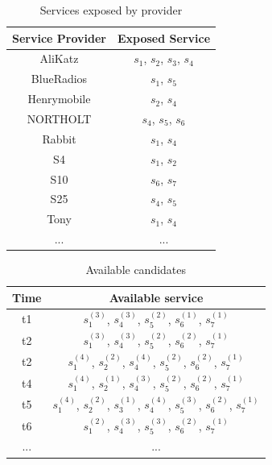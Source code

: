 \documentclass[journal]{IEEEtran}
\begin{document}
\begin{table}[!t]
\renewcommand{\arraystretch}{1.3}
\caption{Services exposed by provider}
\label{Services exposed by provider}
\centering
\begin{tabular}{c c}
\hline
\bfseries Service Provider & \bfseries Exposed Service\\
\hline
AliKatz     & $s_1$, $s_2$, $s_3$, $s_4$\\
BlueRadios  & $s_1$, $s_5$\\
Henrymobile & $s_2$, $s_4$\\
NORTHOLT    & $s_4$, $s_5$, $s_6$ \\
Rabbit      & $s_1$, $s_4$\\
S4          & $s_1$, $s_2$\\
S10         & $s_6$, $s_7$\\
S25         & $s_4$, $s_5$\\
Tony        & $s_1$, $s_4$\\
... & ...\\
\hline
\end{tabular}
\end{table}

\begin{table}[!t]
\renewcommand{\arraystretch}{1.8}
\caption{Available candidates}
\label{Available candidates}
\centering
\begin{tabular}{c c}
\hline
\bfseries Time & \bfseries Available service\\
\hline
t1     & $s_1^{(3)}$, $s_4^{(3)}$, $s_5^{(2)}$, $s_6^{(1)}$, $s_7^{(1)}$ \\
t2     & $s_1^{(3)}$, $s_4^{(3)}$, $s_5^{(2)}$, $s_6^{(2)}$, $s_7^{(1)}$ \\
t2     & $s_1^{(4)}$, $s_2^{(2)}$, $s_4^{(4)}$, $s_5^{(2)}$, $s_6^{(2)}$, $s_7^{(1)}$ \\
t4     & $s_1^{(4)}$, $s_2^{(1)}$, $s_4^{(3)}$, $s_5^{(2)}$, $s_6^{(2)}$, $s_7^{(1)}$ \\
t5     & $s_1^{(4)}$, $s_2^{(2)}$, $s_3^{(1)}$, $s_4^{(4)}$, $s_5^{(3)}$, $s_6^{(2)}$, $s_7^{(1)}$ \\
t6     & $s_1^{(2)}$, $s_4^{(3)}$, $s_5^{(3)}$, $s_6^{(2)}$, $s_7^{(1)}$ \\
... & ...\\
\hline
\end{tabular}
\end{table}
\end{document}
